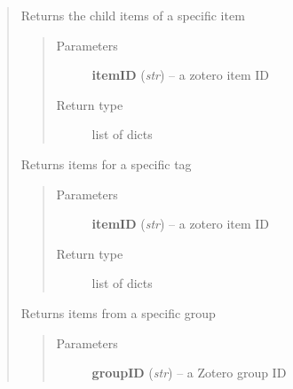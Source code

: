 \documentclass[letterpaper,10pt,english]{sphinxmanual}
\begin{document}
\begin{quote}
\begin{fulllineitems}
\end{fulllineitems}



\begin{fulllineitems}
\label{index:pyzotero.zotero.Zotero.children}
Returns the child items of a specific item
\begin{quote}\begin{description}
\item[{Parameters}] \leavevmode
\textbf{itemID} (\emph{str}) -- a zotero item ID

\item[{Return type}] \leavevmode
list of dicts

\end{description}\end{quote}

\end{fulllineitems}



\begin{fulllineitems}
\label{index:pyzotero.zotero.Zotero.tag_items}
Returns items for a specific tag
\begin{quote}\begin{description}
\item[{Parameters}] \leavevmode
\textbf{itemID} (\emph{str}) -- a zotero item ID

\item[{Return type}] \leavevmode
list of dicts

\end{description}\end{quote}

\end{fulllineitems}



\begin{fulllineitems}
\label{index:pyzotero.zotero.Zotero.group_items}
Returns items from a specific group
\begin{quote}\begin{description}
\item[{Parameters}] \leavevmode
\textbf{groupID} (\emph{str}) -- a Zotero group ID


\end{description}
\end{quote}
\end{fulllineitems}
\end{quote}
\end{document}
